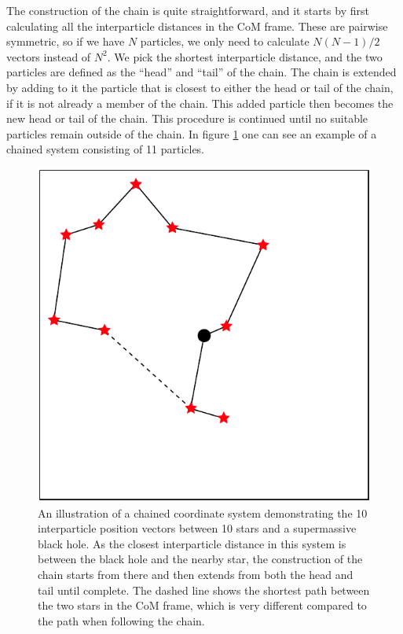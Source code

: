 \documentclass[english, oneside]{HYgradu}
\begin{document}
The construction of the chain is quite straightforward, and it starts by first calculating all the interparticle distances in the CoM frame. These are pairwise symmetric, so if we have $N$ particles, we only need to calculate $N(N-1)/2$ vectors instead of $N^2$. We pick the shortest interparticle distance, and the two particles are defined as the ``head'' and ``tail'' of the chain. The chain is extended by adding to it the particle that is closest to either the head or tail of the chain, if it is not already a member of the chain. This added particle then becomes the new head or tail of the chain. This procedure is continued until no suitable particles remain outside of the chain. In figure \ref{fig:chain} one can see an example of a chained system consisting of 11 particles.

\begin{figure}[h!tb]
\centering
\includegraphics[scale=1]{../images/chain.pdf}
\caption{An illustration of a chained coordinate system demonstrating the 10 interparticle position vectors between 10 stars and a supermassive black hole. As the closest interparticle distance in this system is between the black hole and the nearby star, the construction of the chain starts from there and then extends from both the head and tail until complete. The dashed line shows the shortest path between the two stars in the CoM frame, which is very different compared to the path when following the chain.}
\label{fig:chain}
\end{figure}
\end{document}
